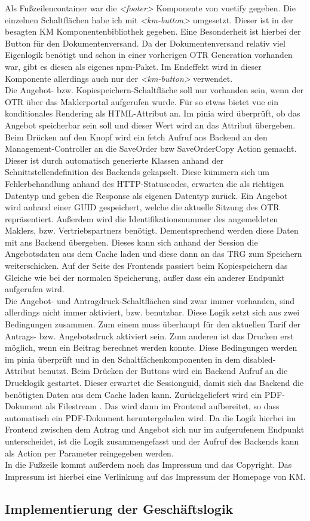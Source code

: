 Als Fußzeilencontainer war die \textit{<footer>} Komponente von \gls{vuetify} gegeben. Die einzelnen Schaltflächen habe ich mit \textit{<km-button>} umgesetzt. Dieser ist in der besagten \ac{KM} Komponentenbibliothek gegeben. Eine Besonderheit ist hierbei der Button für den Dokumentenversand. Da der Dokumentenversand relativ viel Eigenlogik benötigt und schon in einer vorherigen \ac{OTR} Generation vorhanden war, gibt es diesen als eigenes \gls{npm}-Paket. Im Endeffekt wird in dieser Komponente allerdings auch nur der \textit{<km-button>} verwendet.\\
Die Angebot- bzw. Kopiespeichern-Schaltfläche soll nur vorhanden sein, wenn der \ac{OTR} über das Maklerportal aufgerufen wurde. Für so etwas bietet \gls{vue} ein konditionales Rendering als \gls{HTML}-Attribut an. Im \gls{pinia} wird überprüft, ob das Angebot speicherbar sein soll und dieser Wert wird an das Attribut übergeben. Beim Drücken auf den Knopf wird ein \gls{fetch} Aufruf ans Backend an den Management-Controller an die SaveOrder bzw SaveOrderCopy Action  gemacht. Dieser ist durch automatisch generierte Klassen anhand der Schnittstellendefinition des Backends gekapselt. Diese kümmern sich um Fehlerbehandlung anhand des \gls{HTTP}-Statuscodes, erwarten die  als richtigen Datentyp und geben die Response als eigenen Datentyp zurück. Ein Angebot wird anhand einer \ac{GUID} gespeichert, welche die aktuelle Sitzung des \ac{OTR} repräsentiert. Außerdem wird die Identifikationsnummer des angemeldeten Maklers, bzw. Vertriebspartners benötigt. Dementsprechend werden diese Daten mit ans Backend übergeben. Dieses kann sich anhand der Session die Angebotsdaten aus dem Cache laden und diese dann an das \ac{TRG} zum Speichern weiterschicken. Auf der Seite des Frontends passiert beim Kopiespeichern das Gleiche wie bei der normalen Speicherung, außer dass ein anderer Endpunkt aufgerufen wird.\\
Die Angebot- und Antragdruck-Schaltflächen sind zwar immer vorhanden, sind allerdings nicht immer aktiviert, bzw. benutzbar. Diese Logik setzt sich aus zwei Bedingungen zusammen. Zum einem muss überhaupt für den aktuellen Tarif der Antrags- bzw. Angebotsdruck aktiviert sein. Zum anderen ist das Drucken erst möglich, wenn ein Beitrag berechnet werden konnte. Diese Bedingungen werden im \gls{pinia} überprüft und in den Schaltfächenkomponenten in dem disabled-Attribut benutzt. Beim Drücken der Buttons wird ein Backend Aufruf an die Drucklogik gestartet. Dieser erwartet die Sessionguid, damit sich das Backend die benötigten Daten aus dem Cache laden kann. Zurückgeliefert wird ein PDF-Dokument als Filestream . Das wird dann im Frontend aufbereitet, so dass automatisch ein PDF-Dokument heruntergeladen wird. Da die Logik hierbei im Frontend zwischen dem Antrag und Angebot sich nur im aufgerufenem Endpunkt unterscheidet, ist die Logik zusammengefasst und der Aufruf des Backends kann als Action per Parameter reingegeben werden.\\
In die Fußzeile kommt außerdem noch das Impressum und das Copyright. Das Impressum ist hierbei eine Verlinkung auf das Impressum der Homepage von \ac{KM}.
\subsection{Implementierung der Geschäftslogik}
\label{geschaeftslogikimplementieren}
